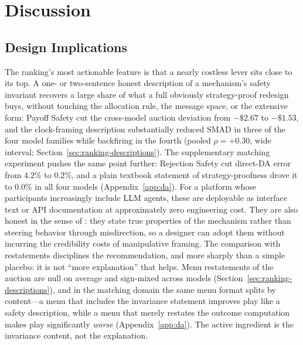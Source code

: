 
\section{Discussion}\label{sec:discussion}

\subsection{Design Implications}\label{sec:discussion-implications}

The ranking's most actionable feature is that a nearly costless lever sits close to its top. A one- or two-sentence honest description of a mechanism's safety invariant recovers a large share of what a full obviously strategy-proof redesign buys, without touching the allocation rule, the message space, or the extensive form: Payoff Safety cut the cross-model auction deviation from $-\$2.67$ to $-\$1.53$, and the clock-framing description substantially reduced SMAD in three of the four model families while backfiring in the fourth (pooled $\rho=+0.30$, wide interval; Section~\ref{sec:ranking-descriptions}). The supplementary matching experiment pushes the same point further: Rejection Safety cut direct-DA error from $4.2\%$ to $0.2\%$, and a plain textbook statement of strategy-proofness drove it to $0.0\%$ in all four models (Appendix~\ref{app:da}). For a platform whose participants increasingly include LLM agents, these are deployable as interface text or API documentation at approximately zero engineering cost. They are also honest in the sense of \citet{gonczarowski2023strategyproofness}: they state true properties of the mechanism rather than steering behavior through misdirection, so a designer can adopt them without incurring the credibility costs of manipulative framing. The comparison with restatements disciplines the recommendation, and more sharply than a simple placebo: it is not ``more explanation'' that helps. Menu restatements of the auction are null on average and sign-mixed across models (Section~\ref{sec:ranking-descriptions}), and in the matching domain the same menu format splits by content---a menu that includes the invariance statement improves play like a safety description, while a menu that merely restates the outcome computation makes play significantly \emph{worse} (Appendix~\ref{app:da}). The active ingredient is the invariance content, not the explanation.

